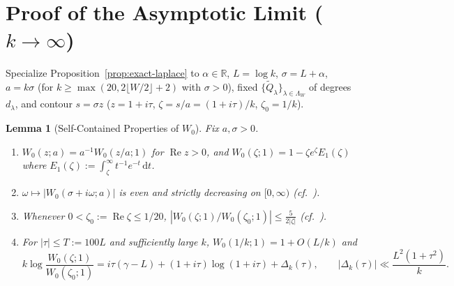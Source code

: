 \documentclass[11pt, reqno]{amsart}
\newtheorem{lemma}{Lemma}[section]
\theoremstyle{remark}
\numberwithin{equation}{section}
\DeclareMathOperator{\re}{Re}
\newcommand{\R}{\mathbb{R}}
\newcommand{\dd}{\,\mathrm{d}}
\begin{document}
\section{Proof of the Asymptotic Limit (\texorpdfstring{$k \to \infty$}{k -> infinity})}\label{sec:asymptotic}

Specialize Proposition~\ref{prop:exact-laplace} to $\alpha \in \R$, $L = \log k$, $\sigma = L+\alpha$,
$a = k\sigma$ (for $k \ge \max(20, 2\lfloor W/2\rfloor + 2)$ with $\sigma > 0$), fixed $\{\widetilde{Q}_\lambda\}_{\lambda\in\Lambda_W}$
of degrees $d_\lambda$, and contour $s = \sigma z$ ($z = 1+i\tau$, $\zeta = s/a = (1+i\tau)/k$, $\zeta_0 = 1/k$).

\begin{lemma}[Self-Contained Properties of $W_0$]\label{lem:W0-props}
Fix $a, \sigma > 0$.
\begin{enumerate}
\item[(i)] $W_0(z; a) = a^{-1} W_0(z/a; 1)$ for $\re z > 0$, and $W_0(\zeta; 1) = 1 - \zeta e^\zeta E_1(\zeta)$
where $E_1(\zeta) := \int_\zeta^\infty t^{-1} e^{-t}\dd t$.
\item[(ii)] $\omega \mapsto |W_0(\sigma + i\omega; a)|$ is even and strictly decreasing on $[0,\infty)$ (cf.\ \cite[Lemma~5]{Lewulis}).
\item[(iii)] Whenever $0 < \zeta_0 := \re\zeta \le 1/20$, $|W_0(\zeta;1)/W_0(\zeta_0;1)| \le \frac{5}{2|\zeta|}$ (cf.\ \cite[Lemma~6]{Lewulis}).
\item[(iv)] For $|\tau| \le T := 100 L$ and sufficiently large $k$, $W_0(1/k;1) = 1 + O(L/k)$ and
\begin{equation}\label{eq:W0-log-exp}
k \log\frac{W_0(\zeta;1)}{W_0(\zeta_0;1)} = i\tau(\gamma - L) + (1+i\tau)\log(1+i\tau) + \Delta_k(\tau),
\qquad |\Delta_k(\tau)| \ll \frac{L^2(1+\tau^2)}{k}.
\end{equation}
\end{enumerate}
\end{lemma}
\end{document}
